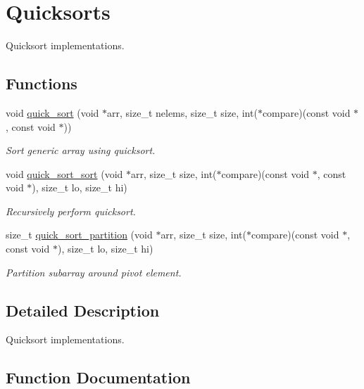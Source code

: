 \hypertarget{group__QuickSort}{}\section{Quicksorts}
\label{group__QuickSort}


Quicksort implementations.  


\subsection*{Functions}
\begin{DoxyCompactItemize}
\item 
void \hyperlink{group__QuickSort_gacc1abed6e3519de02d60503e0b214932}{quick\+\_\+sort} (void $\ast$arr, size\+\_\+t nelems, size\+\_\+t size, int($\ast$compare)(const void $\ast$, const void $\ast$))
\begin{DoxyCompactList}\small\item\em Sort generic array using quicksort. \end{DoxyCompactList}\item 
void \hyperlink{group__QuickSort_ga4a465523bf71478872301ee552edb403}{quick\+\_\+sort\+\_\+sort} (void $\ast$arr, size\+\_\+t size, int($\ast$compare)(const void $\ast$, const void $\ast$), size\+\_\+t lo, size\+\_\+t hi)
\begin{DoxyCompactList}\small\item\em Recursively perform quicksort. \end{DoxyCompactList}\item 
size\+\_\+t \hyperlink{group__QuickSort_gae45617fa4741c13bc601fe2a984fdc2c}{quick\+\_\+sort\+\_\+partition} (void $\ast$arr, size\+\_\+t size, int($\ast$compare)(const void $\ast$, const void $\ast$), size\+\_\+t lo, size\+\_\+t hi)
\begin{DoxyCompactList}\small\item\em Partition subarray around pivot element. \end{DoxyCompactList}\end{DoxyCompactItemize}


\subsection{Detailed Description}
Quicksort implementations. 



\subsection{Function Documentation}
\mbox{\label{group__QuickSort_gacc1abed6e3519de02d60503e0b214932}} 
